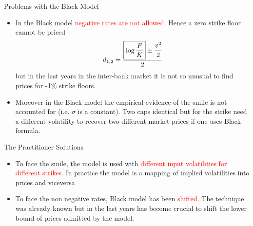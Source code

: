 \documentclass{beamer}
\begin{document}
%

\begin{frame}{Problems with the Black Model}
\begin{itemize}
	\item In the Black model \textcolor{red}{negative rates are not allowed}. Hence a zero strike floor cannot be priced
	\begin{equation*}
		d_{1,2} = \frac{\boxed{\log{\frac{F}{K}}} \pm \cfrac{v^2}{2}}{2} 
	\end{equation*}
	but in the last years in the inter-bank market it is not so unusual to find prices for -1\% strike floors.
	\item Moreover in the Black model the empirical evidence of the smile is not accounted for (i.e. $\sigma$ is a constant). Two caps identical but for the strike need a different volatility to recover two different market prices if one uses Black formula.
\end{itemize}
\end{frame}

\begin{frame}{The Practitioner Solutions}
\begin{itemize}
	\item To face the smile, the model is used with \textcolor{red}{different input volatilities for different strikes}. In practice the model is a mapping of implied volatilities into prices and viceversa%
	\item To face the non negative rates, Black model has been \textcolor{red}{shifted}. The technique was already known but in the last years has become crucial to shift the lower bound of prices admitted by the model.
\end{itemize}
\end{frame}
\end{document}

